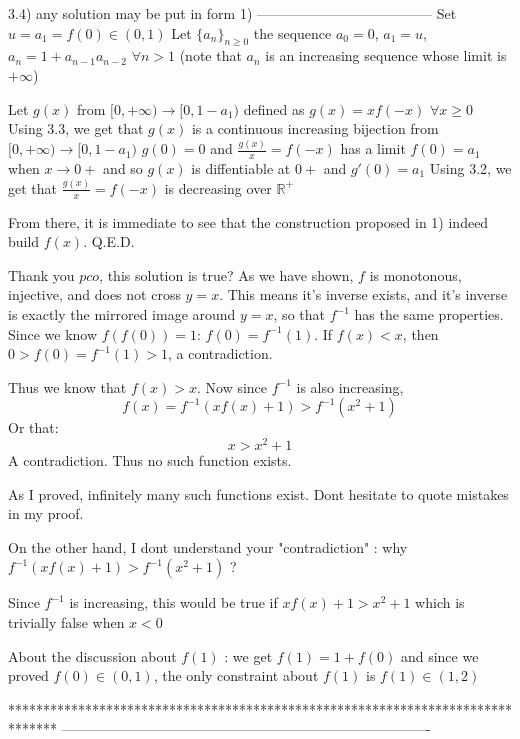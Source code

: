 \begin{solution}
3.4) any solution may be put in form 1)
--------------------------------------
Set $u=a_1=f(0)\in(0,1)$
Let $\{a_n\}_{n\ge 0}$ the sequence $a_0=0$, $a_1=u$, $a_n=1+a_{n-1}a_{n-2}$ $\forall n>1$
(note that $a_n$ is an increasing sequence whose limit is $+\infty$)

Let $g(x)$ from $[0,+\infty)\to[0,1-a_1)$ defined as $g(x)=xf(-x)$ $\forall x\ge 0$
Using 3.3, we get that $g(x)$ is a continuous increasing bijection from $[0,+\infty)\to[0,1-a_1)$
$g(0)=0$ and $\frac{g(x)}x=f(-x)$ has a limit $f(0)=a_1$ when $x\to 0+$ and so $g(x)$ is diffentiable at $0+$ and $g'(0)=a_1$
Using 3.2, we get that $\frac{g(x)}x=f(-x)$ is decreasing over $\mathbb R^+$

From there, it is immediate to see that the construction proposed in 1) indeed build $f(x)$.
Q.E.D.
\end{solution}



\begin{solution}
	Thank you $pco$, this solution is true?
As we  have shown, $f$ is monotonous, injective, and does not cross $y=x$. This means it's inverse exists, and it's inverse is exactly the mirrored image around $y=x$, so that $f^{-1}$ has the same properties. Since we know $f(f(0)) = 1$: $f(0) = f^{-1}(1)$. If $f(x) < x$, then $0 > f(0) = f^{-1}(1)> 1$, a contradiction. 

Thus we know that $f(x)>x$. Now since $f^{-1}$ is also increasing, \[f(x) = f^{-1}(xf(x)+1) > f^{-1}(x^2+1)\] Or that:
\[x > x^2+1\]
A contradiction. Thus no such function exists.
\end{solution}



\begin{solution}
	As I proved, infinitely many such functions exist. Dont hesitate to quote mistakes in my proof.

On the other hand, I dont understand your "contradiction" : why $f^{-1}(xf(x)+1)>f^{-1}(x^2+1)$ ?

Since $f^{-1}$ is increasing, this would be true if $xf(x)+1>x^2+1$ which is trivially false when $x<0$
\end{solution}



\begin{solution}
	About the discussion about $f(1)$ : we get $f(1)=1+f(0)$ and since we proved $f(0)\in(0,1)$, the only constraint about $f(1)$ is $\boxed{f(1)\in(1,2)}$
\end{solution}
*******************************************************************************
-------------------------------------------------------------------------------

